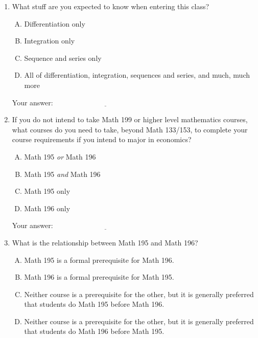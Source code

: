 \documentclass[10pt]{amsart}
\begin{document}
\begin{enumerate}
\item What stuff are you expected to know when entering this class?

  \begin{enumerate}[(A)]
  \item Differentiation only
  \item Integration only
  \item Sequence and series only
  \item All of differentiation, integration, sequences and series, and
    much, much more
  \end{enumerate}

  \vspace{0.1in}
  Your answer: $\underline{\qquad\qquad\qquad\qquad\qquad\qquad\qquad}$
  \vspace{0.1in}

\item If you do not intend to take Math 199 or higher level
  mathematics courses, what courses do you need to take, beyond Math
  133/153, to complete your course requirements if you intend to major
  in economics?

  \begin{enumerate}[(A)]
  \item Math 195 {\em or} Math 196
  \item Math 195 {\em and} Math 196
  \item Math 195 only
  \item Math 196 only
  \end{enumerate}

  \vspace{0.1in}
  Your answer: $\underline{\qquad\qquad\qquad\qquad\qquad\qquad\qquad}$
  \vspace{0.1in}

\item What is the relationship between Math 195 and Math 196?

  \begin{enumerate}[(A)]
  \item Math 195 is a formal prerequisite for Math 196.
  \item Math 196 is a formal prerequisite for Math 195.
  \item Neither course is a prerequisite for the other, but it is generally preferred that students do Math 195 before Math 196.
  \item Neither course is a prerequisite for the other, but it is
    generally preferred that students do Math 196 before Math 195.
  \end{enumerate}


\end{enumerate}
\end{document}
